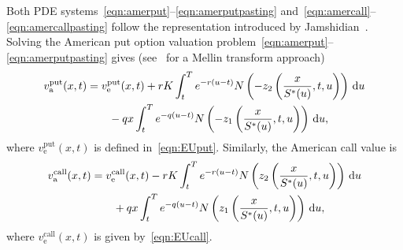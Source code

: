 Both PDE systems~\eqref{eqn:amerput}--\eqref{eqn:amerputpasting} and~\eqref{eqn:amercall}--\eqref{eqn:amercallpasting}  follow the representation introduced by Jamshidian~\cite{Jamshidian1992}. Solving the American put option valuation problem~\eqref{eqn:amerput}--\eqref{eqn:amerputpasting} gives (see~\cite{Rodrigo2013} for a Mellin transform approach)
	\begin{equation}
		\label{eqn:americanput}
		\begin{split}
			v_\text{a}^{\text{put}}(x,t) &= v_\text{e}^{\text{put}}(x,t) + rK\int_t^T e^{-r(u-t)}N\left( -z_2\left( \frac{x}{S^*(u)},t,u \right) \right) \, \mathrm d u \\
			& \qquad - qx\int_t^T e^{-q(u-t)}N\left( -z_1\left( \frac{x}{S^*(u)},t,u \right) \right) \, \mathrm d u,
		\end{split}
	\end{equation}
where $v_\text{e}^{\text{put}}(x,t)$ is defined in~\eqref{eqn:EUput}. Similarly, the American call value is
	\begin{equation}
		\label{eqn:americancall}
		\begin{split}
			v_\text{a}^{\text{call}}(x,t) &= v_\text{e}^{\text{call}}(x,t) - rK\int_t^T e^{-r(u-t)}N\left( z_2\left( \frac{x}{S^*(u)},t,u \right) \right) \, \mathrm d u \\
			& \qquad + qx\int_t^T e^{-q(u-t)}N\left( z_1\left( \frac{x}{S^*(u)},t,u \right) \right) \, \mathrm d u,
		\end{split}
	\end{equation}
where $v_\text{e}^{\text{call}}(x,t)$ is given by~\eqref{eqn:EUcall}.

